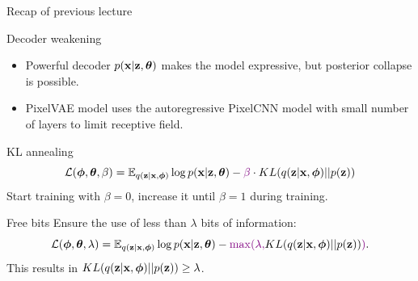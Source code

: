 \begin{frame}{Recap of previous lecture}
	\begin{block}{Decoder weakening}
		\begin{itemize}
			\item Powerful decoder $p(\mathbf{x} | \mathbf{z}, \boldsymbol{\theta})$ makes the model expressive, but posterior collapse is possible.
			\item PixelVAE model uses the autoregressive PixelCNN model with small number of layers to limit receptive field.
		\end{itemize}
	\end{block}
	
	\begin{block}{KL annealing}
		\vspace{-0.6cm}
		\[
			\mathcal{L}(\boldsymbol{\phi}, \boldsymbol{\theta}, \beta) = \mathbb{E}_{q(\mathbf{z} | \mathbf{x}, \boldsymbol{\phi})} \log p(\mathbf{x} | \mathbf{z}, \boldsymbol{\theta}) - {\color{violet}\beta} \cdot KL (q(\mathbf{z} | \mathbf{x}, \boldsymbol{\phi}) || p(\mathbf{z}))
		\]
		Start training with $\beta = 0$, increase it until $\beta = 1$ during training.
	\end{block}
	
	\begin{block}{Free bits}
		Ensure the use of less than $\lambda$ bits of information:
		\[
		\mathcal{L}(\boldsymbol{\phi}, \boldsymbol{\theta}, \lambda) = \mathbb{E}_{q(\mathbf{z} | \mathbf{x}, \boldsymbol{\phi})} \log p(\mathbf{x} | \mathbf{z}, \boldsymbol{\theta}) - {\color{violet}\max(\lambda,} KL (q(\mathbf{z} | \mathbf{x}, \boldsymbol{\phi}) || p(\mathbf{z})){\color{violet})}.
		\]
		This results in $KL (q(\mathbf{z} | \mathbf{x}, \boldsymbol{\phi}) || p(\mathbf{z})) \geq \lambda$.
	\end{block}
\end{frame}
